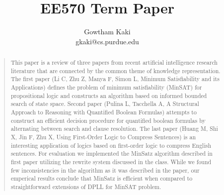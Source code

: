 \documentclass[letterpaper]{article}
\begin{document}
\title{EE570 Term Paper}
\author{Gowtham Kaki\\
gkaki@cs.purdue.edu\\
}

\maketitle
\begin{abstract}
\begin{quote}
This paper is a review of three papers from recent artificial intelligence
research literature that are connected by the common theme of knowledge
representation. The first paper (Li C, Zhu Z, Manya F, Simon L, Minimum
Satisfiability and its Applications) defines the problem of minimum
satisfiability (MinSAT) for propositional logic and constructs an algorithm
based on informed bounded search of state space. Second paper (Pulina L,
Tacchella A, A Structural Approach to Reasoning with Quantified Boolean
Formulas) attempts to construct an efficient decision procedure for quantified
boolean formulas by alternating between search and clause resolution. The last
paper (Huang M, Shi X, Jin F, Zhu X, Using First-Order Logic to Compress
Sentences) is an interesting application of logics based on first-order logic to
compress English sentences. For evaluation we implemented the MinSatz algorithm
described in first paper utilizing the rewrite system discussed in the class.
While we found few inconsistencies in the algorithm as it was described in the
paper, our emperical results conclude that MinSatz is efficient when compared to
straightforward extensions of DPLL for MinSAT problem.
\end{quote}
\end{abstract}








\end{document}
